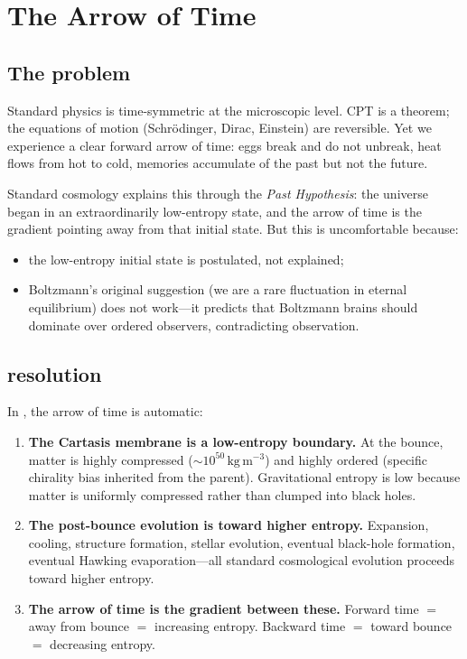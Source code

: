 \chapter{The Arrow of Time}
\label{chap:timearrow}

\section{The problem}

Standard physics is time-symmetric at the microscopic level. CPT is a theorem;
the equations of motion (Schr\"odinger, Dirac, Einstein) are reversible. Yet we
experience a clear forward arrow of time: eggs break and do not unbreak, heat
flows from hot to cold, memories accumulate of the past but not the future.

Standard cosmology explains this through the \emph{Past Hypothesis}: the universe
began in an extraordinarily low-entropy state, and the arrow of time is the
gradient pointing away from that initial state. But this is uncomfortable
because:

\begin{itemize}
  \item the low-entropy initial state is postulated, not explained;
  \item Boltzmann's original suggestion (we are a rare fluctuation in eternal
    equilibrium) does not work---it predicts that Boltzmann brains should
    dominate over ordered observers, contradicting observation.
\end{itemize}

\section{\SCT resolution}

In \SCT, the arrow of time is automatic:

\begin{enumerate}
  \item \textbf{The Cartasis membrane is a low-entropy boundary.} At the bounce,
    matter is highly compressed ($\sim 10^{50}\,\mathrm{kg\,m^{-3}}$) and highly
    ordered (specific chirality bias inherited from the parent). Gravitational
    entropy is low because matter is uniformly compressed rather than clumped
    into black holes.
  \item \textbf{The post-bounce evolution is toward higher entropy.} Expansion,
    cooling, structure formation, stellar evolution, eventual black-hole
    formation, eventual Hawking evaporation---all standard cosmological evolution
    proceeds toward higher entropy.
  \item \textbf{The arrow of time is the gradient between these.} Forward time
    $=$ away from bounce $=$ increasing entropy. Backward time $=$ toward bounce
    $=$ decreasing entropy.
\end{enumerate}

